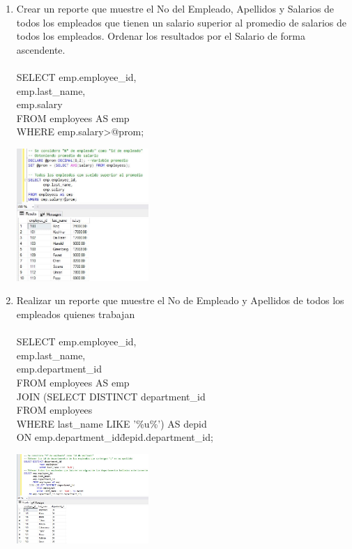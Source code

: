 \begin{enumerate}[1.]
	\item Crear un reporte que muestre el No del Empleado, Apellidos y Salarios de todos los empleados que tienen un salario superior al promedio de salarios de todos los empleados. Ordenar los resultados por el Salario de forma ascendente.
	\\
	\\SELECT emp.employee\_id, \\
	emp.last\_name, \\
	emp.salary \\
	FROM employees AS emp \\
	WHERE emp.salary>@prom; \\
	\begin{center}
	\includegraphics[width=5cm]{./Imagenes/actividad0902} 
	\end{center}

	\item Realizar un reporte que muestre el No de Empleado y Apellidos de todos los empleados quienes trabajan
	\\
	\\SELECT emp.employee\_id, \\
	emp.last\_name, \\
	emp.department\_id \\
	FROM employees AS emp \\
	JOIN (SELECT DISTINCT department\_id \\
		  FROM employees \\
		  WHERE last\_name LIKE '\%u\%') AS depid \\
	ON emp.department\_id\=depid.department\_id; \\
	\begin{center}
	\includegraphics[width=5cm]{./Imagenes/actividad0903} 
	\end{center}


\end{enumerate}
